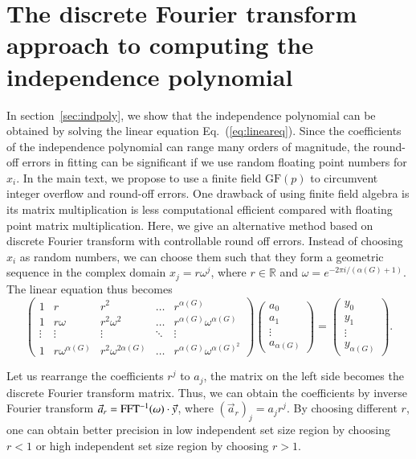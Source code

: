 \documentclass[onefignum, onetabnum]{siamart190516}
\newcommand{\<}{\langle}
\renewcommand{\>}{\rangle}
\newcommand{\Eq}[1]{Eq.~(\ref{#1})}
\begin{document}
\section{The discrete Fourier transform approach to computing the independence polynomial}\label{sec:fft}

In section~\ref{sec:indpoly}, we show that the independence polynomial can be obtained by solving the linear equation \Eq{eq:lineareq}.
Since the coefficients of the independence polynomial can range many orders of magnitude, the round-off errors in fitting can be significant if we use random floating point numbers for $x_{i}$.
In the main text, we propose to use a finite field $\text{GF}(p)$ to circumvent integer overflow and round-off errors.
One drawback of using finite field algebra is its matrix multiplication is less computational efficient compared with floating point matrix multiplication.
Here, we give an alternative method based on discrete Fourier transform with controllable round off errors.
Instead of choosing $x_{i}$ as random numbers, we can choose them such that they form a geometric sequence in the complex domain $x_j = r\omega^j$, where $r \in \mathbb{R}$ and $\omega = e^{-2\pi i/( \alpha(G)+1)}$. The linear equation thus becomes
\begin{equation}
\left(\begin{matrix}
1 & r & r^2 & \ldots & r^{\alpha(G)} \\
1 & r\omega & r^2\omega^2 & \ldots & r^{\alpha(G)} \omega^{\alpha(G)} \\
\vdots & \vdots & \vdots &\ddots & \vdots \\
1 & r\omega^{\alpha(G)} & r^2\omega^{2{\alpha(G)}} & \ldots & r^{\alpha(G)}\omega^{{\alpha(G)}^2}
\end{matrix}\right)
\left(\begin{matrix}
a_0 \\ a_1 \\ \vdots \\ a_{\alpha(G)}
\end{matrix}\right)
= \left(\begin{matrix}
y_0 \\ y_1 \\ \vdots \\ y_{\alpha(G)}
\end{matrix}\right).
\end{equation}

Let us rearrange the coefficients $r^j$ to $a_j$, the matrix on the left side becomes the discrete Fourier transform matrix. Thus, we can obtain the coefficients by inverse Fourier transform $\vec a_r = {\rm FFT^{-1}}(\omega) \cdot \vec y$, where $(\vec a_r)_j = a_j r ^j$.
By choosing different $r$, one can obtain better precision in low independent set size region by choosing $r<1$ or high independent set size region by choosing $r>1$.
\end{document}
